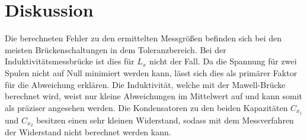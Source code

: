 \section{Diskussion}
\label{sec:Diskussion}
Die berechneten Fehler zu den ermittelten Messgrößen befinden sich bei den meisten
Brückenschaltungen in dem Toleranzbereich. Bei der Induktivitätsmessbrücke ist dies
für $L_x$ nicht der Fall. Da die Spannung für zwei Spulen nicht auf Null minimiert werden kann, lässt sich dies
als primärer Faktor für die Abweichung erklären. Die Induktivität, welche mit der Mawell-Brücke berechnet wird, weist
nur kleine Abweichungen im Mittelwert auf und kann somit als präziser angesehen werden. Die Kondensatoren
zu den beiden Kapazitäten $C_{x_1}$ und $C_{x_2}$ besitzen einen sehr kleinen Widerstand, sodass mit dem
Messverfahren der Widerstand nicht berechnet werden kann.
